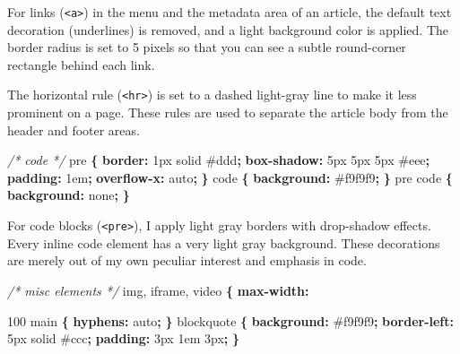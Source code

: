 \documentclass[12pt,]{krantz}
\makeatletter
\newenvironment{Shaded}{\begin{snugshade}}{\end{snugshade}}
\newcommand{\KeywordTok}[1]{\textcolor[rgb]{0.13,0.29,0.53}{\textbf{#1}}}
\newcommand{\DataTypeTok}[1]{\textcolor[rgb]{0.13,0.29,0.53}{#1}}
\newcommand{\CommentTok}[1]{\textcolor[rgb]{0.56,0.35,0.01}{\textit{#1}}}
\newcommand{\NormalTok}[1]{#1}
\newenvironment{kframe}{%
\medskip{}
\setlength{\fboxsep}{.8em}
 \def\at@end@of@kframe{}%
 \ifinner\ifhmode%
  \def\at@end@of@kframe{\end{minipage}}%
  \begin{minipage}{\columnwidth}%
 \fi\fi%
 \def\FrameCommand##1{\hskip\@totalleftmargin \hskip-\fboxsep
 \colorbox{shadecolor}{##1}\hskip-\fboxsep
     \hskip-\linewidth \hskip-\@totalleftmargin \hskip\columnwidth}%
 \MakeFramed {\advance\hsize-\width
   \@totalleftmargin\z@ \linewidth\hsize
   \@setminipage}}%
 {\par\unskip\endMakeFramed%
 \at@end@of@kframe}
\renewenvironment{Shaded}{\begin{kframe}}{\end{kframe}}
\theoremstyle{definition}
\theoremstyle{definition}
\theoremstyle{definition}
\theoremstyle{remark}
\makeatother
\begin{document}
\begin{itemize}
  For links (\texttt{\textless{}a\textgreater{}}) in the menu and the
  metadata area of an article, the default text decoration (underlines)
  is removed, and a light background color is applied. The border radius
  is set to 5 pixels so that you can see a subtle round-corner rectangle
  behind each link.

  The horizontal rule (\texttt{\textless{}hr\textgreater{}}) is set to a
  dashed light-gray line to make it less prominent on a page. These
  rules are used to separate the article body from the header and footer
  areas.

\begin{Shaded}
\begin{Highlighting}[]
\CommentTok{/* code */}
\NormalTok{pre }\KeywordTok{\{}
  \KeywordTok{border:} \DataTypeTok{1px} \DataTypeTok{solid} \DataTypeTok{#ddd}\KeywordTok{;}
  \KeywordTok{box-shadow:} \DataTypeTok{5px} \DataTypeTok{5px} \DataTypeTok{5px} \DataTypeTok{#eee}\KeywordTok{;}
  \KeywordTok{padding:} \DataTypeTok{1em}\KeywordTok{;}
  \KeywordTok{overflow-x:} \DataTypeTok{auto}\KeywordTok{;}
\KeywordTok{\}}
\NormalTok{code }\KeywordTok{\{} \KeywordTok{background:} \DataTypeTok{#f9f9f9}\KeywordTok{;} \KeywordTok{\}}
\NormalTok{pre code }\KeywordTok{\{} \KeywordTok{background:} \DataTypeTok{none}\KeywordTok{;} \KeywordTok{\}}
\end{Highlighting}
\end{Shaded}

  For code blocks (\texttt{\textless{}pre\textgreater{}}), I apply light
  gray borders with drop-shadow effects. Every inline code element has a
  very light gray background. These decorations are merely out of my own
  peculiar interest and emphasis in code.

\begin{Shaded}
\begin{Highlighting}[]
\CommentTok{/* misc elements */}
\NormalTok{img, iframe, video }\KeywordTok{\{} \KeywordTok{max-width:} \DataTypeTok{100%
\NormalTok{main }\KeywordTok{\{} \KeywordTok{hyphens:} \DataTypeTok{auto}\KeywordTok{;} \KeywordTok{\}}
\NormalTok{blockquote }\KeywordTok{\{}
  \KeywordTok{background:} \DataTypeTok{#f9f9f9}\KeywordTok{;}
  \KeywordTok{border-left:} \DataTypeTok{5px} \DataTypeTok{solid} \DataTypeTok{#ccc}\KeywordTok{;}
  \KeywordTok{padding:} \DataTypeTok{3px} \DataTypeTok{1em} \DataTypeTok{3px}\KeywordTok{;}
\KeywordTok{\}}

}
\end{Highlighting}
\end{Shaded}
\end{itemize}
\end{document}
